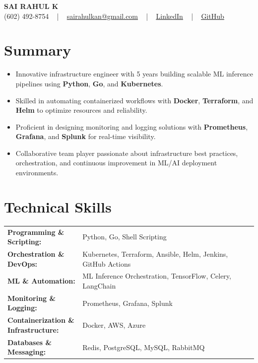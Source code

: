 \documentclass[letterpaper,11pt]{article}
\newcommand{\resumeItem}[1]{
  \item\footnotesize{
    {#1 \vspace{-2pt}}
  }
}
\newcommand{\resumeItemListStart}{\begin{itemize}[leftmargin=*]}
\newcommand{\resumeItemListEnd}{\end{itemize}\vspace{-5pt}}
\begin{document}
\begin{center}
    {\fontsize{14pt}{12pt}\selectfont \textbf{\MakeUppercase{Sai Rahul K}}}\\ \vspace{2pt}
    \fontsize{10pt}{12pt}\selectfont (602) 492-8754 ~ | ~ \href{mailto:sairahulkan@gmail.com}{sairahulkan@gmail.com} ~ | ~
    \href{https://www.linkedin.com/in/rq123/}{\color{blue}\underline{LinkedIn}} ~ | ~
    \href{https://github.com/kanrahuldo}{\color{blue}\underline{GitHub}}~
    \vspace{-8pt}
\end{center}

\section{Summary}
\fontsize{9pt}{10pt}\selectfont
\resumeItemListStart
    \resumeItem{Innovative infrastructure engineer with 5\+ years building scalable ML inference pipelines using \textbf{Python}, \textbf{Go}, and \textbf{Kubernetes}.}
    \resumeItem{Skilled in automating containerized workflows with \textbf{Docker}, \textbf{Terraform}, and \textbf{Helm} to optimize resources and reliability.}
    \resumeItem{Proficient in designing monitoring and logging solutions with \textbf{Prometheus}, \textbf{Grafana}, and \textbf{Splunk} for real-time visibility.}
    \resumeItem{Collaborative team player passionate about infrastructure best practices, orchestration, and continuous improvement in ML/AI deployment environments.}
\resumeItemListEnd
\vspace{-6pt}

\section{Technical Skills}
        \vspace{-14pt}
        \begin{table}[h]
            \fontsize{9pt}{10pt}\selectfont
            \begin{tabular}{p{0.3\linewidth} p{0.7\linewidth}}
                \textbf{Programming \& Scripting:} & Python, Go, Shell Scripting \\
                \textbf{Orchestration \& DevOps:} & Kubernetes, Terraform, Ansible, Helm, Jenkins, GitHub Actions \\
                \textbf{ML \& Automation:} & ML Inference Orchestration, TensorFlow, Celery, LangChain \\
                \textbf{Monitoring \& Logging:} & Prometheus, Grafana, Splunk \\
                \textbf{Containerization \& Infrastructure:} & Docker, AWS, Azure \\
                \textbf{Databases \& Messaging:} & Redis, PostgreSQL, MySQL, RabbitMQ \\
            \end{tabular}
        \end{table}
    \vspace{-15pt}
\end{document}

